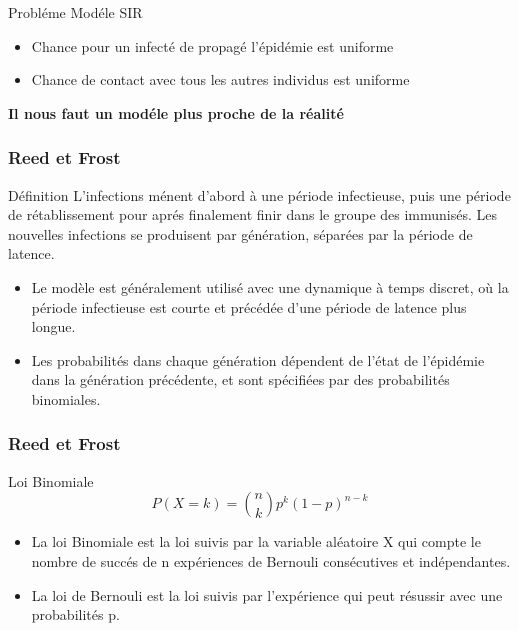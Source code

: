 \begin{frame}
    \begin{block}{Probléme Modéle SIR}
        \begin{itemize}
            \item Chance pour un infecté de propagé l'épidémie est uniforme
            \item Chance de contact avec tous les autres individus est uniforme
        \end{itemize}
    \end{block}

    \begin{center}
        \bf Il nous faut un modéle plus proche de la réalité
    \end{center}
\end{frame}


\begin{frame}
    \frametitle{Reed et Frost}

    \begin{block}{Définition}
        L'infections ménent d'abord à une période infectieuse, puis une période de rétablissement pour aprés finalement finir dans le groupe des immunisés. Les nouvelles infections se produisent par génération, séparées par la période de latence.
    \end{block}

    \begin{itemize}
        \item Le modèle est généralement utilisé avec une dynamique à temps discret, où la période infectieuse est courte et précédée d’une période de latence plus longue.
        \item Les probabilités dans chaque génération dépendent de l’état de l’épidémie dans la génération précédente, et sont spécifiées par des probabilités binomiales.
    \end{itemize}
\end{frame}

\begin{frame}
    \frametitle{Reed et Frost}

    \begin{alertblock}{Loi Binomiale}
        $$ P(X = k) = \binom{n}{k}p^k(1 - p)^{n-k} $$
    \end{alertblock}

    \begin{itemize}
        \item La loi Binomiale est la loi suivis par la variable aléatoire X qui compte le nombre de succés de n expériences de Bernouli consécutives et indépendantes.
        \item La loi de Bernouli est la loi suivis par l'expérience qui peut résussir avec une probabilités p.
    \end{itemize}
\end{frame}


